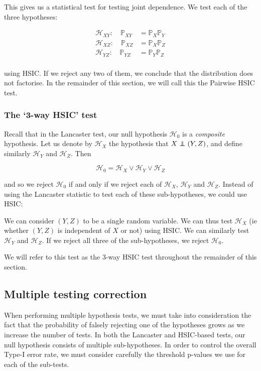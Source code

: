 \documentclass[12pt]{article}
\newcommand\independent{\protect\mathpalette{\protect\independenT}{\perp}}
\def\independenT#1#2{\mathrel{\rlap{$#1#2$}\mkern2mu{#1#2}}}
\numberwithin{claim}{section}
\numberwithin{lemma}{section}
\numberwithin{theorem}{section}
\begin{document}
This gives us a statistical test for testing joint dependence. We test each of the three hypotheses:

\begin{align*}
\mathcal{H}_{XY}: \quad \mathbb{P}_{XY } &= \mathbb{P}_{X}\mathbb{P}_{Y}\\
\mathcal{H}_{XZ}: \quad \mathbb{P}_{XZ } &= \mathbb{P}_{X}\mathbb{P}_{Z}\\
\mathcal{H}_{YZ}: \quad \mathbb{P}_{YZ } &= \mathbb{P}_{Y}\mathbb{P}_{Z}\\
\end{align*}

using HSIC. If we reject any two of them, we conclude that the distribution does not factorise. In the remainder of this section, we will call this the Pairwise HSIC test.

\subsubsection{The `3-way HSIC' test}

Recall that in the Lancaster test, our null hypothesis $\mathcal{H}_0$ is a \emph{composite} hypothesis. Let us denote by $\mathcal{H}_X$ the hypothesis that $X \independent (Y,Z)$, and define similarly  $\mathcal{H}_Y$ and  $\mathcal{H}_Z$. Then

\[ \mathcal{H}_0 =  \mathcal{H}_X \lor \mathcal{H}_Y \lor \mathcal{H}_Z \]

and so we reject $\mathcal{H}_0$ if and only if we reject each of $\mathcal{H}_X$, $\mathcal{H}_Y$ and  $\mathcal{H}_Z$. Instead of using the Lancaster statistic to test each of these sub-hypotheses, we could use HSIC:

We can consider $(Y,Z)$ to be a single random variable. We can thus test $\mathcal{H}_X$ (ie whether $(Y,Z)$ is independent of $X$ or not) using HSIC. We can similarly test $\mathcal{H}_Y$ and $\mathcal{H}_Z$. If we reject all three of the sub-hypotheses, we reject $\mathcal{H}_0$. 

We will refer to this test as the 3-way HSIC test throughout the remainder of this section.


\subsection{Multiple testing correction}

When performing multiple hypothesis tests, we must take into consideration the fact that the probability of falsely rejecting one of the hypotheses grows as we increase the number of tests. In both the Lancaster and HSIC-based tests, our null hypothesis consists of multiple sub-hypotheses. In order to control the overall Type-I error rate, we must consider carefully the threshold p-values we use for each of the sub-tests.
\end{document}
